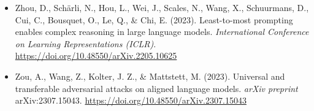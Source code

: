 \begin{itemize}[leftmargin=1.5em, label={}, itemsep=0.22ex, parsep=0pt]
    \item Zhou, D., Schärli, N., Hou, L., Wei, J., Scales, N., Wang, X., Schuurmans, D., Cui, C., Bousquet, O., Le, Q., \& Chi, E. (2023). Least-to-most prompting enables complex reasoning in large language models. \textit{International Conference on Learning Representations (ICLR)}. \url{https://doi.org/10.48550/arXiv.2205.10625}
    \item Zou, A., Wang, Z., Kolter, J. Z., \& Mattstett, M. (2023). Universal and transferable adversarial attacks on aligned language models. \textit{arXiv preprint} arXiv:2307.15043. \url{https://doi.org/10.48550/arXiv.2307.15043}
\end{itemize}
